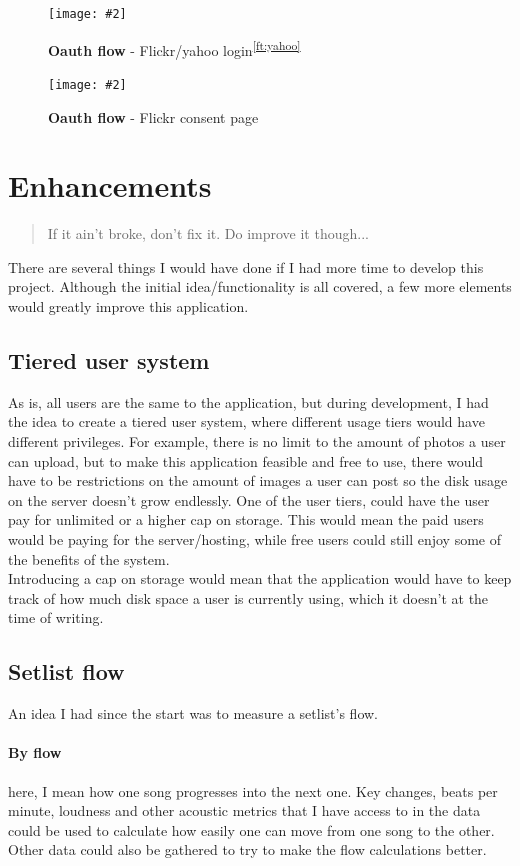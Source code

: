 \documentclass[10pt, a4paper]{article}
\newcommand{\figuremacro}[5]{
\begin{figure}[#1]
\centering
\texttt{[image: \#2]}
\caption[#3]{\textbf{#3}#4}
\label{fig:#2}
\end{figure}
}
\newcommand{\footref}[1]{\textsuperscript{\ref{#1}}}
\begin{document}
        \figuremacro{h}{flickr-login}{Oauth flow}{ - Flickr/yahoo login\footref{ft:yahoo}}{1.0}

        \figuremacro{h}{flickr-consent}{Oauth flow}{ - Flickr consent page}{1.0}

        \section{Enhancements}
        \label{sec:enhancements}
        \blockquote{If it ain't broke, don't fix it. Do improve it though...}

        There are several things I would have done if I had more time to develop this project. Although the initial idea/functionality is all covered, a few more elements would greatly improve this application. 

        \subsection{Tiered user system}	
        As is, all users are the same to the application, but during development, I had the idea to create a tiered user system, where different usage tiers would have different privileges. For example, there is no limit to the amount of photos a user can upload, but to make this application feasible and free to use, there would have to be restrictions on the amount of images a user can post so the disk usage on the server doesn't grow endlessly. One of the user tiers, could have the user pay for unlimited or a higher cap on storage. This would mean the paid users would be paying for the server/hosting, while free users could still enjoy some of the benefits of the system.\\
        Introducing a cap on storage would mean that the application would have to keep track of how much disk space a user is currently using, which it doesn't at the time of writing.

        \subsection{Setlist flow}
        An idea I had since the start was to measure a setlist's flow.\\
        \paragraph{By flow} here, I mean how one song progresses into the next one. Key changes, beats per minute, loudness and other acoustic metrics that I have access to in the data could be used to calculate how easily one can move from one song to the other. Other data could also be gathered to try to make the flow calculations better.
\end{document}
